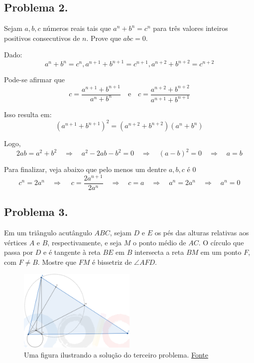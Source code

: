 \documentclass[12pt]{article}
\begin{document}
    \subsection{Problema 2.}
      \begin{tcolorbox}[problembox={Enunciado do problema}]
        Sejam \( a, b, c \) números reais tais que \( a^n + b^n = c^n \) para três
        valores inteiros positivos consecutivos de \( n \). Prove que \( abc = 0 \).
      \end{tcolorbox}

      Dado:
      \[
        a^n + b^n = c^n, a^{n+1} + b^{n+1} = c^{n+1}, a^{n+2} + b^{n+2} = c^{n+2}
      \]

      Pode-se afirmar que
      \[
        c = \frac{a^{n+1} + b^{n+1}}{a^n + b^n} \quad \text{e} \quad c = \frac{a^{n+2} + b^{n+2}}{a^{n+1} + b^{n+1}}
      \]

      Isso resulta em:
      \[
        (a^{n+1} + b^{n+1})^2 = (a^{n+2} + b^{n+2})(a^n + b^n)
      \]

      Logo,
      \[
        2ab = a^2 + b^2 \quad \Rightarrow \quad a^2 - 2ab -b^2 = 0 \quad \Rightarrow \quad (a-b)^2 = 0 \quad \Rightarrow \quad a = b
      \]

      Para finalizar, veja abaixo que  pelo menos um dentre $a,b,c$ é 0
      \[
        c^n = 2a^n \quad \Rightarrow \ \quad c = \frac{2a^{n+1}}{2a^n} \quad \Rightarrow \quad c = a \quad \Rightarrow \quad a^n = 2a^n \quad \Rightarrow \quad a^n = 0
      \]

    \clearpage

    \subsection{Problema 3.}
    \begin{tcolorbox}[problembox={Enunciado do problema}]
      Em um triângulo acutângulo \( ABC \), sejam \( D \) e \( E \) os pés das
      alturas relativas aos vértices \( A \) e \( B \), respectivamente, e seja
      \( M \) o ponto médio de \( AC \). O círculo que passa por \( D \) e é tangente
      à reta \( BE \) em \( B \) intersecta a reta \( BM \) em um ponto \( F \), com
      \( F \ne B \). Mostre que \( FM \) é bissetriz de \( \angle AFD \).
    \end{tcolorbox}

    \begin{figure}[h]
      \centering
      \includegraphics[width=0.5\textwidth]{first.png}
      \caption{Uma figura ilustrando a solução do terceiro problema. \href{https://noic.com.br/wp-content/uploads/2023/11/Solucoes_da_TM2_Nivel_A.pdf}{Fonte}}
    \end{figure}
    
\end{document}
